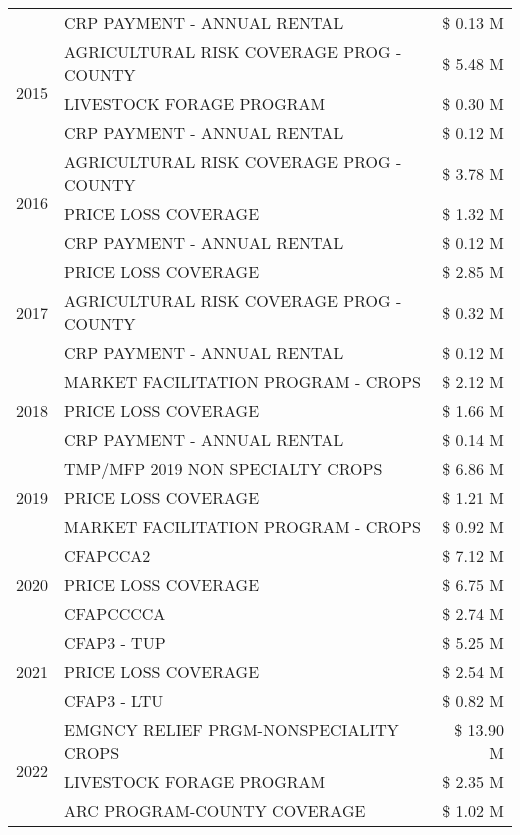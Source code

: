 \begin{tabular}{llr}
 & CRP PAYMENT - ANNUAL RENTAL & \$ 0.13 M \\
\cline{1-3}
\multirow[t]{3}{*}{2015} & AGRICULTURAL RISK COVERAGE PROG - COUNTY & \$ 5.48 M \\
 & LIVESTOCK FORAGE PROGRAM & \$ 0.30 M \\
 & CRP PAYMENT - ANNUAL RENTAL & \$ 0.12 M \\
\cline{1-3}
\multirow[t]{3}{*}{2016} & AGRICULTURAL RISK COVERAGE PROG - COUNTY & \$ 3.78 M \\
 & PRICE LOSS COVERAGE & \$ 1.32 M \\
 & CRP PAYMENT - ANNUAL RENTAL & \$ 0.12 M \\
\cline{1-3}
\multirow[t]{3}{*}{2017} & PRICE LOSS COVERAGE & \$ 2.85 M \\
 & AGRICULTURAL RISK COVERAGE PROG - COUNTY & \$ 0.32 M \\
 & CRP PAYMENT - ANNUAL RENTAL & \$ 0.12 M \\
\cline{1-3}
\multirow[t]{3}{*}{2018} & MARKET FACILITATION PROGRAM - CROPS & \$ 2.12 M \\
 & PRICE LOSS COVERAGE & \$ 1.66 M \\
 & CRP PAYMENT - ANNUAL RENTAL & \$ 0.14 M \\
\cline{1-3}
\multirow[t]{3}{*}{2019} & TMP/MFP 2019 NON SPECIALTY CROPS & \$ 6.86 M \\
 & PRICE LOSS COVERAGE & \$ 1.21 M \\
 & MARKET FACILITATION PROGRAM - CROPS & \$ 0.92 M \\
\cline{1-3}
\multirow[t]{3}{*}{2020} & CFAPCCA2 & \$ 7.12 M \\
 & PRICE LOSS COVERAGE & \$ 6.75 M \\
 & CFAPCCCCA & \$ 2.74 M \\
\cline{1-3}
\multirow[t]{3}{*}{2021} & CFAP3 - TUP & \$ 5.25 M \\
 & PRICE LOSS COVERAGE & \$ 2.54 M \\
 & CFAP3 - LTU & \$ 0.82 M \\
\cline{1-3}
\multirow[t]{3}{*}{2022} & EMGNCY RELIEF PRGM-NONSPECIALITY CROPS & \$ 13.90 M \\
 & LIVESTOCK FORAGE PROGRAM & \$ 2.35 M \\
 & ARC PROGRAM-COUNTY COVERAGE & \$ 1.02 M \\
\cline{1-3}
\bottomrule
\end{tabular}
